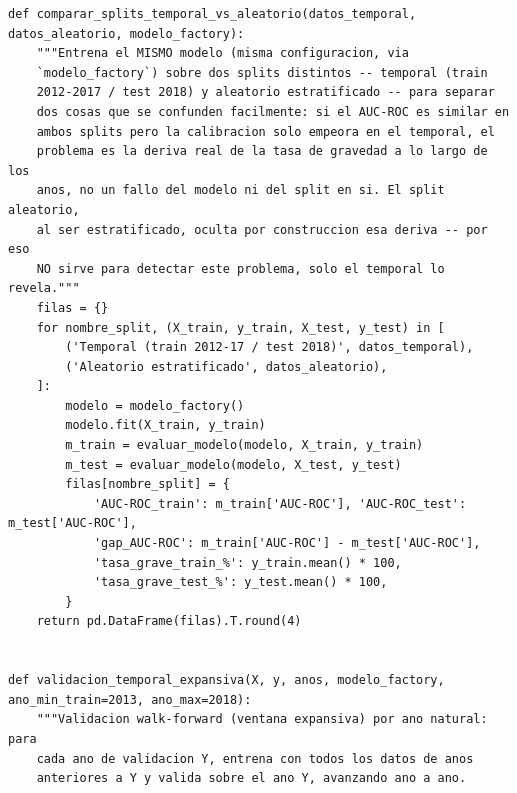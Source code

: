 \documentclass[11pt,a4paper]{article}
\begin{document}
\begin{lstlisting}[caption={Estabilidad del bagging, comparación temporal vs. aleatoria, y validación de ventana expansiva.}]
def comparar_splits_temporal_vs_aleatorio(datos_temporal, datos_aleatorio, modelo_factory):
    """Entrena el MISMO modelo (misma configuracion, via
    `modelo_factory`) sobre dos splits distintos -- temporal (train
    2012-2017 / test 2018) y aleatorio estratificado -- para separar
    dos cosas que se confunden facilmente: si el AUC-ROC es similar en
    ambos splits pero la calibracion solo empeora en el temporal, el
    problema es la deriva real de la tasa de gravedad a lo largo de los
    anos, no un fallo del modelo ni del split en si. El split aleatorio,
    al ser estratificado, oculta por construccion esa deriva -- por eso
    NO sirve para detectar este problema, solo el temporal lo revela."""
    filas = {}
    for nombre_split, (X_train, y_train, X_test, y_test) in [
        ('Temporal (train 2012-17 / test 2018)', datos_temporal),
        ('Aleatorio estratificado', datos_aleatorio),
    ]:
        modelo = modelo_factory()
        modelo.fit(X_train, y_train)
        m_train = evaluar_modelo(modelo, X_train, y_train)
        m_test = evaluar_modelo(modelo, X_test, y_test)
        filas[nombre_split] = {
            'AUC-ROC_train': m_train['AUC-ROC'], 'AUC-ROC_test': m_test['AUC-ROC'],
            'gap_AUC-ROC': m_train['AUC-ROC'] - m_test['AUC-ROC'],
            'tasa_grave_train_%': y_train.mean() * 100,
            'tasa_grave_test_%': y_test.mean() * 100,
        }
    return pd.DataFrame(filas).T.round(4)


def validacion_temporal_expansiva(X, y, anos, modelo_factory, ano_min_train=2013, ano_max=2018):
    """Validacion walk-forward (ventana expansiva) por ano natural: para
    cada ano de validacion Y, entrena con todos los datos de anos
    anteriores a Y y valida sobre el ano Y, avanzando ano a ano.


\end{lstlisting}
\end{document}
